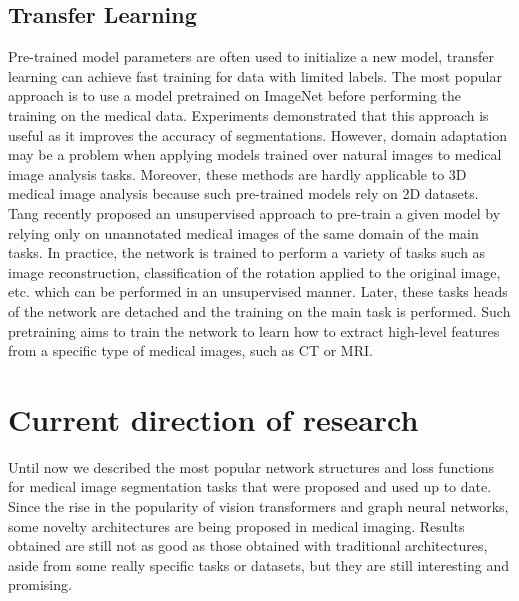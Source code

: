 \subsection{Transfer Learning}
Pre-trained model parameters are often used to initialize a new model,
transfer learning can achieve fast training for data with limited labels. The
most popular approach is to use a model pretrained on ImageNet before performing
the training on the medical data. Experiments demonstrated that this approach is
useful as it improves the accuracy of segmentations. However, domain
adaptation may be a problem when applying models trained over natural images to
medical image analysis tasks. Moreover, these methods are hardly applicable to
3D medical image analysis because such pre-trained models rely on 2D datasets.\\
Tang \etal \cite{tang2022self} recently proposed an unsupervised approach to
pre-train a given model by relying only on unannotated medical images of the
same domain of the main tasks. In practice, the network is trained to perform a
variety of tasks such as image reconstruction, classification of the rotation
applied to the original image, etc. which can be performed in an unsupervised
manner. Later, these tasks heads of the network are detached and the training on
the main task is performed. Such pretraining aims to train the network to learn
how to extract high-level features from a specific type of medical images, such
as CT or MRI.

\section{Current direction of research}
Until now we described the most popular network structures and loss functions
for medical image segmentation tasks that were proposed and used up to date.
Since the rise in the popularity of vision transformers and graph neural
networks, some novelty architectures are being proposed in medical imaging.
Results obtained are still not as good as those obtained with traditional
architectures, aside from some really specific tasks or datasets, but they are
still interesting and promising.

